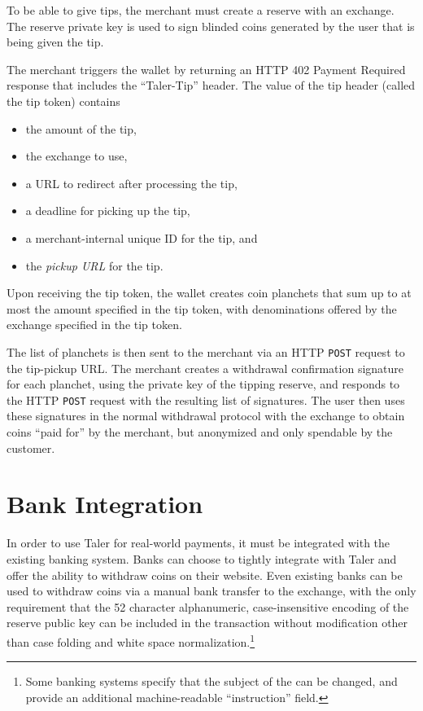 To be able to give tips, the merchant must create a reserve with an exchange.  The reserve private key
is used to sign blinded coins generated by the user that is being given the tip.

The merchant triggers the wallet by returning an HTTP 402 Payment Required
response that includes the ``Taler-Tip'' header. The value of the tip header (called the
tip token) contains
\begin{itemize}
  \item the amount of the tip,
  \item the exchange to use,
  \item a URL to redirect after processing the tip,
  \item a deadline for picking up the tip,
  \item a merchant-internal unique ID for the tip, and
  \item the \emph{pickup URL} for the tip.
\end{itemize}
Upon receiving the tip token, the wallet creates coin planchets that sum up to at most
the amount specified in the tip token, with denominations offered by the exchange specified in the tip token.

The list of planchets is then sent to the merchant via an HTTP \texttt{POST}
request to the tip-pickup URL.  The merchant creates a withdrawal confirmation
signature for each planchet, using the private key of the tipping reserve, and
responds to the HTTP \texttt{POST} request with the resulting list of
signatures.  The user then uses these signatures in the normal withdrawal
protocol with the exchange to obtain coins ``paid for'' by the merchant, but
anonymized and only spendable by the customer.


\section{Bank Integration}
In order to use Taler for real-world payments, it must be integrated with the
existing banking system.  Banks can choose to tightly integrate with Taler and
offer the ability to withdraw coins on their website.  Even existing banks can
be used to withdraw coins via a manual bank transfer to the exchange, with the
only requirement that the 52 character alphanumeric, case-insensitive encoding
of the reserve public key can be included in the transaction without
modification other than case folding and white space
normalization.\footnote{Some banking systems specify that the subject of the
can be changed, and provide an additional machine-readable ``instruction''
field.  }

